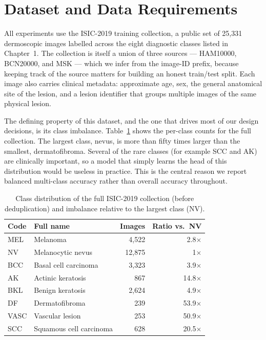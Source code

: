 \section{Dataset and Data Requirements}

All experiments use the ISIC-2019 training collection, a public set of 25{,}331
dermoscopic images labelled across the eight diagnostic classes listed in
Chapter~1. The collection is itself a union of three sources --- HAM10000,
BCN20000, and MSK --- which we infer from the image-ID prefix, because keeping
track of the source matters for building an honest train/test split. Each image
also carries clinical metadata: approximate age, sex, the general anatomical
site of the lesion, and a lesion identifier that groups multiple images of the
same physical lesion.

The defining property of this dataset, and the one that drives most of our
design decisions, is its class imbalance. Table~\ref{tab:classdist} shows the
per-class counts for the full collection. The largest class, nevus, is more than
fifty times larger than the smallest, dermatofibroma. Several of the rare
classes (for example SCC and AK) are clinically important, so a model that
simply learns the head of this distribution would be useless in practice. This
is the central reason we report balanced multi-class accuracy rather than overall
accuracy throughout.

\begin{table}[H]
\centering
\caption{Class distribution of the full ISIC-2019 collection (before
deduplication) and imbalance relative to the largest class (NV).}
\label{tab:classdist}
\begin{tabular}{llrr}
\toprule
Code & Full name & Images & Ratio vs.\ NV \\
\midrule
MEL  & Melanoma                  & 4{,}522  & 2.8$\times$  \\
NV   & Melanocytic nevus         & 12{,}875 & 1$\times$    \\
BCC  & Basal cell carcinoma      & 3{,}323  & 3.9$\times$  \\
AK   & Actinic keratosis         & 867      & 14.8$\times$ \\
BKL  & Benign keratosis          & 2{,}624  & 4.9$\times$  \\
DF   & Dermatofibroma            & 239      & 53.9$\times$ \\
VASC & Vascular lesion           & 253      & 50.9$\times$ \\
SCC  & Squamous cell carcinoma   & 628      & 20.5$\times$ \\
\bottomrule
\end{tabular}
\end{table}

